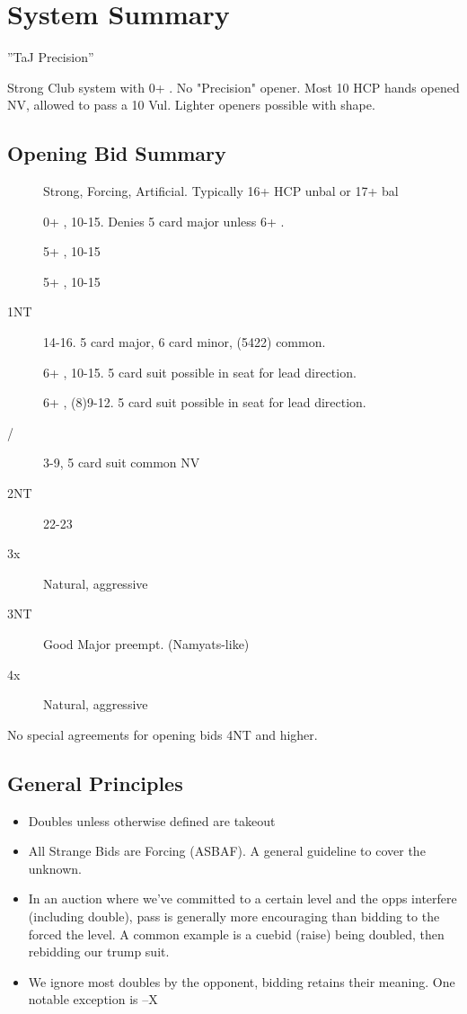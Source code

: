 \documentclass[tom-ari]{subfile}
\begin{document}
	
\chapter{System Summary}


''TaJ Precision''

Strong Club system with 0+ .  No "Precision"  opener.  Most 10 HCP hands opened NV, allowed to pass a 10 Vul. Lighter openers possible with shape.  

\section{Opening Bid Summary}

\begin{description}
	\item[] Strong, Forcing, Artificial.  Typically 16+ HCP unbal or 17+ bal
	\item[] 0+ \diamondsuit, 10-15.  Denies 5 card major unless 6+ \diamondsuit.
	\item[] 5+ \heartsuit, 10-15
	\item[] 5+ \spadesuit, 10-15
	\item[1NT] 14-16.  5 card major, 6 card minor, (5422) common.
	\item[] 6+ \clubsuit, 10-15.  5 card suit possible in \third seat for lead direction.
	\item[] 6+ \diamondsuit, (8)9-12.  5 card suit possible in \third seat for lead direction.
	\item[/] 3-9, 5 card suit common NV
	\item[2NT] 22-23
	\item[3x] Natural, aggressive
	\item[3NT] Good Major preempt.  (Namyats-like)
	\item[4x] Natural, aggressive
\end{description}

No special agreements for opening bids 4NT and higher.

\section{General Principles}

\begin{itemize}
	\item Doubles unless otherwise defined are takeout
	\item All Strange Bids are Forcing (ASBAF).  A general guideline to cover the unknown.
	\item In an auction where we've committed to a certain level and the opps interfere (including double), pass is generally more encouraging than bidding to the forced the level.  A common example is a cuebid (raise) being doubled, then rebidding our trump suit.
	\item We ignore most doubles by the opponent, bidding retains their meaning.  One notable exception is --X
\end{itemize}	
\end{document}
